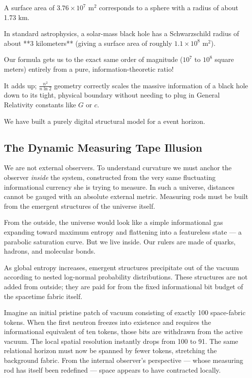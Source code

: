 A surface area of $3.76 \times 10^7 \text{ m}^2$ corresponds to a sphere with a radius of about 1.73 km.

In standard astrophysics, a solar-mass black hole has a Schwarzschild radius of about **3 kilometers** (giving a surface area of roughly $1.1 \times 10^8 \text{ m}^2$).

Our formula gets us to the exact same order of magnitude ($10^7$ to $10^8$ square meters) entirely from a pure,
information-theoretic ratio!

It adds up;  $\frac{n^2}{n\ln 2}$ geometry correctly scales the massive information of a black hole
down to its tight, physical boundary without needing to plug in General Relativity constants like $G$ or $c$.

We have built a purely digital structural model for a event horizon.



\subsection*{The Dynamic Measuring Tape Illusion}

We are not external observers. To understand curvature we must anchor the observer \textit{inside} the system, 
constructed from the very same fluctuating informational currency she is trying to measure. 
In such a universe, distances cannot be gauged with an absolute external metric. 
Measuring rods must be built from the emergent structures of the universe itself.

From the outside, the universe would look like a simple informational gas expanding toward maximum entropy 
and flattening into a featureless state --- a parabolic saturation curve. 
But we live inside. Our rulers are made of quarks, hadrons, and molecular bonds.

As global entropy increases, emergent structures precipitate out of the vacuum according to nested log-normal probability distributions. 
These structures are not added from outside; they are paid for from the fixed informational bit budget of the spacetime fabric itself.

Imagine an initial pristine patch of vacuum consisting of exactly 100 space-fabric tokens. 
When the first neutron freezes into existence and requires the informational equivalent of ten tokens, 
those bits are withdrawn from the active vacuum. 
The local spatial resolution instantly drops from 100 to 91. 
The same relational horizon must now be spanned by fewer tokens, stretching the background fabric. 
From the internal observer's perspective --- whose measuring rod has itself been redefined --- space appears to have contracted locally.


